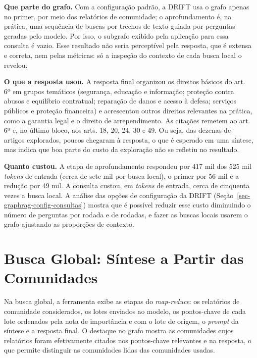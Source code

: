 \textbf{Que parte do grafo.} Com a configuração padrão, a DRIFT usa o grafo apenas no primer, por meio dos relatórios de comunidade; o aprofundamento é, na prática, uma sequência de buscas por trechos de texto guiada por perguntas geradas pelo modelo. Por isso, o subgrafo exibido pela aplicação para essa consulta é vazio. Esse resultado não seria perceptível pela resposta, que é extensa e correta, nem pelas métricas: só a inspeção do contexto de cada busca local o revelou.

\textbf{O que a resposta usou.} A resposta final organizou os direitos básicos do art. 6º em grupos temáticos (segurança, educação e informação; proteção contra abusos e equilíbrio contratual; reparação de danos e acesso à defesa; serviços públicos e proteção financeira) e acrescentou outros direitos relevantes na prática, como a garantia legal e o direito de arrependimento. As citações remetem ao art. 6º e, no último bloco, aos arts. 18, 20, 24, 30 e 49. Ou seja, das dezenas de artigos explorados, poucos chegaram à resposta, o que é esperado em uma síntese, mas indica que boa parte do custo da exploração não se refletiu no resultado.

\textbf{Quanto custou.} A etapa de aprofundamento respondeu por 417 mil dos 525 mil \textit{tokens} de entrada (cerca de sete mil por busca local), o primer por 56 mil e a redução por 49 mil. A consulta custou, em \textit{tokens} de entrada, cerca de cinquenta vezes a busca local. A análise das opções de configuração da DRIFT (Seção~\ref{sec-graphrag-config-consultas}) mostra que é possível reduzir esse custo diminuindo o número de perguntas por rodada e de rodadas, e fazer as buscas locais usarem o grafo ajustando as proporções de contexto.

\section{Busca Global: Síntese a Partir das Comunidades}
\label{sec-analise-global}

Na busca global, a ferramenta exibe as etapas do \textit{map-reduce}: os relatórios de comunidade considerados, os lotes enviados ao modelo, os pontos-chave de cada lote ordenados pela nota de importância e com o lote de origem, o \textit{prompt} da síntese e a resposta final. O destaque no grafo mostra as comunidades cujos relatórios foram efetivamente citados nos pontos-chave relevantes e na resposta, o que permite distinguir as comunidades lidas das comunidades usadas.


